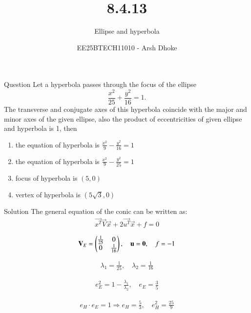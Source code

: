 \documentclass{beamer}
\title{8.4.13}
\subtitle{Ellipse and hyperbola}
\author{EE25BTECH11010 - Arsh Dhoke}
\date{}
\begin{document}
\frame{\titlepage}

\begin{frame}{Question}
Let a hyperbola passes through the focus of the ellipse 
\[
\frac{x^2}{25} + \frac{y^2}{16} = 1.
\]
The transverse and conjugate axes of this hyperbola coincide with the major and minor axes of the given ellipse, also the product of eccentricities of given ellipse and hyperbola is 1, then
\begin{multicols}{2}
\begin{enumerate}
    \item the equation of hyperbola is 
    $\frac{x^2}{9} - \frac{y^2}{16} = 1$
    \item the equation of hyperbola is 
    $\frac{x^2}{9} - \frac{y^2}{25} = 1$
    \item focus of hyperbola is $(5, 0)$
    \item vertex of hyperbola is $(5\sqrt{3}, 0)$
\end{enumerate}
\end{multicols}
\end{frame}

\begin{frame}{Solution}
The general equation of the conic can be written as:
\begin{align}
\vec{x^T}\vec{V}\vec{x} + 2\vec{u^T}\vec{x} + f = 0
\end{align}

\begin{align}
\mathbf{V}_E=\begin{pmatrix}\frac{1}{25}&0\\0&\frac{1}{16}\end{pmatrix}, \quad \mathbf{u}=\mathbf{0}, \quad f=-1
\end{align}

\begin{align}
\lambda_1=\frac{1}{25}, \quad \lambda_2=\frac{1}{16}
\end{align}

\begin{align}
e_E^2 = 1 - \frac{\lambda_1}{\lambda_2}, \quad 
e_E = \frac{3}{5}
\end{align}

\begin{align}
e_H \cdot e_E = 1 \Rightarrow e_H = \frac{5}{3}, \quad e_H^2 = \frac{25}{9}
\end{align}
\end{frame}
\end{document}
